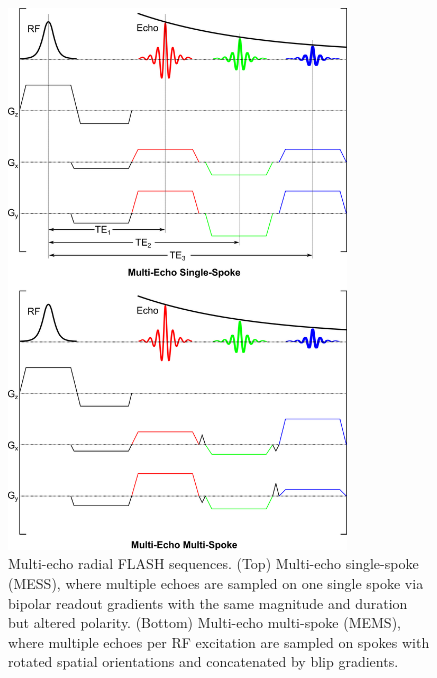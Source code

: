 \begin{figure}[p]
  \centering
  \includegraphics[width=0.80\textwidth]{fig/multi-echo-seq.png}
  \caption{Multi-echo radial FLASH sequences. (Top) Multi-echo single-spoke (\acs{MESS}), where multiple echoes are sampled on one single spoke via bipolar readout gradients with the same magnitude and duration but altered polarity. (Bottom) Multi-echo multi-spoke (\acs{MEMS}), where multiple echoes per RF excitation are sampled on spokes with rotated spatial orientations and concatenated by blip gradients.} \label{Fig:multi-echo-seq}
\end{figure}

